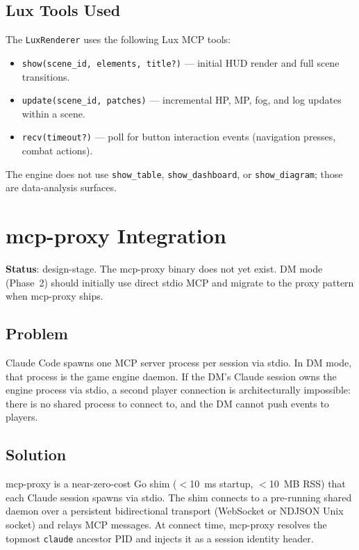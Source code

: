 \documentclass[a4paper,10pt]{article}
\newcommand{\tool}[1]{\texttt{#1}}
\newcommand{\cmd}[1]{\texttt{#1}}
\begin{document}
\subsection{Lux Tools Used}

The \texttt{LuxRenderer} uses the following Lux MCP tools:

\begin{itemize}
  \item \tool{show(scene\_id, elements, title?)} --- initial HUD render
    and full scene transitions.
  \item \tool{update(scene\_id, patches)} --- incremental HP, MP, fog,
    and log updates within a scene.
  \item \tool{recv(timeout?)} --- poll for button interaction events
    (navigation presses, combat actions).
\end{itemize}

The engine does not use \tool{show\_table}, \tool{show\_dashboard},
or \tool{show\_diagram}; those are data-analysis surfaces.

\section{mcp-proxy Integration}

\textbf{Status}: design-stage.  The mcp-proxy binary does not yet
exist.  DM mode (Phase~2) should initially use direct stdio MCP and
migrate to the proxy pattern when mcp-proxy ships.

\subsection{Problem}

Claude Code spawns one MCP server process per session via stdio.
In DM mode, that process is the game engine daemon.  If the DM's
Claude session owns the engine process via stdio, a second player
connection is architecturally impossible: there is no shared process
to connect to, and the DM cannot push events to players.

\subsection{Solution}

mcp-proxy is a near-zero-cost Go shim ($<$10~ms startup,
$<$10~MB RSS) that each Claude session spawns via stdio.  The shim
connects to a pre-running shared daemon over a persistent
bidirectional transport (WebSocket or NDJSON Unix socket) and
relays MCP messages.  At connect time, mcp-proxy resolves the
topmost \cmd{claude} ancestor PID and injects it as a session
identity header.
\end{document}
